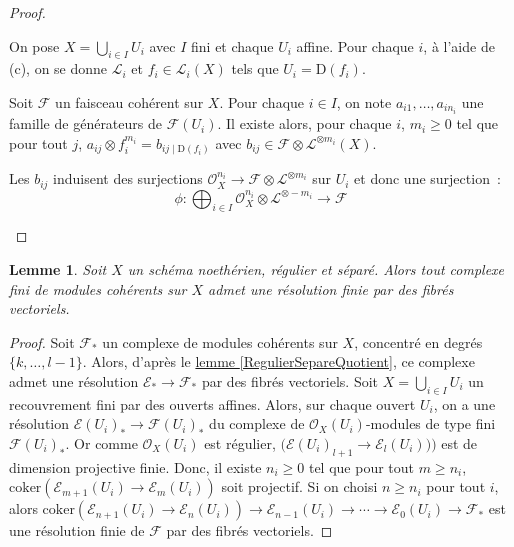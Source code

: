 \documentclass{amsart}
\newcommand{\sref}[2]{\hyperref[#2]{#1 \ref*{#2}}}
\theoremstyle{plain}
\newtheorem{lem}[theo]{Lemme}
\theoremstyle{definition}
\theoremstyle{remark}
\newcommand{\Ring}[1]{\mathcal{O}_{#1}}
\newcommand{\ra}{\rightarrow}
\newcommand{\lra}{\longrightarrow}
\newcommand{\coker}[1]{\mathrm{coker}({#1})}
\newcommand{\im}[1]{\mathrm({#1})}
\newcommand{\Open}[1]{\mathrm{D}({#1})}
\begin{document}
\begin{proof}
\begin{description}
    On pose $X=\bigcup_{i\in I} U_i$ avec $I$ fini et chaque $U_i$ affine. Pour chaque $i$, à l'aide de (c), on se donne $\mathcal{L}_i$
    et $f_i\in\mathcal{L}_i(X)$ tels que $U_i=\Open{f_i}$.

    Soit $\mathcal{F}$ un faisceau cohérent sur $X$. Pour chaque $i\in I$, on note $a_{i1},\dotsc,a_{in_i}$ une famille de générateurs de
    $\mathcal{F}(U_i)$. Il existe alors, pour chaque $i$, $m_i\geq 0$ tel que pour tout $j$, $a_{ij}\otimes f_i^{m_i}=b_{ij\mid\Open{f_i}}$
    avec $b_{ij}\in \mathcal{F}\otimes \mathcal{L}^{\otimes m_i}(X)$.

    Les $b_{ij}$ induisent des surjections $\Ring{X}^{n_i}\lra \mathcal{F}\otimes\mathcal{L}^{\otimes m_i}$ sur $U_i$ et donc une surjection~:
    $$\phi:\bigoplus_{i\in I}\Ring{X}^{n_i}\otimes\mathcal{L}^{\otimes -m_i}\lra \mathcal{F}$$
  \end{description}
\end{proof}

\begin{lem}\label{resolutionsVB}
  Soit $X$ un schéma noethérien, régulier et séparé. Alors tout complexe fini de modules cohérents sur $X$ 
  admet une résolution finie par des fibrés vectoriels.  
\end{lem}

\begin{proof}
  Soit $\mathcal{F}_*$ un complexe de modules cohérents sur $X$, concentré en degrés $\{k,\dotsc,l-1\}$. Alors, d'après le 
  \sref{lemme}{RegulierSepareQuotient}, ce complexe admet une résolution $\mathcal{E}_*\ra \mathcal{F}_*$ par des fibrés vectoriels.
  Soit $X=\bigcup_{i\in I} U_i$ un recouvrement fini par des ouverts affines.
  Alors, sur chaque ouvert $U_i$, on a une résolution $\mathcal{E}(U_i)_*\ra \mathcal{F}(U_i)_*$ du complexe de
  $\Ring{X}(U_i)$-modules de type fini $\mathcal{F}(U_i)_*$. Or comme $\Ring{X}(U_i)$ est régulier, $\im{\mathcal{E}(U_i)_{l+1}\ra \mathcal{E}_l(U_i))}$
  est de dimension projective finie. Donc, il existe $n_i\geq 0$ tel que pour tout 
  $m\geq n_i$, $\coker{\mathcal{E}_{m+1}(U_i)\ra \mathcal{E}_m(U_i)}$ soit projectif.
  Si on choisi $n\geq n_i$ pour tout $i$, alors 
  $\coker{\mathcal{E}_{n+1}(U_i)\ra \mathcal{E}_n(U_i)}\ra \mathcal{E}_{n-1}(U_i)\ra\dotsb\ra \mathcal{E}_0(U_i)\ra \mathcal{F}_*$ est une 
  résolution finie de $\mathcal{F}$ par des fibrés vectoriels.
\end{proof}
\end{document}
